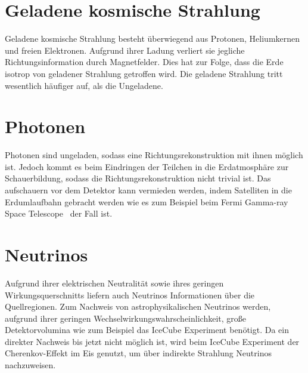 \section*{Geladene kosmische Strahlung}
Geladene kosmische Strahlung besteht überwiegend aus Protonen, Heliumkernen und freien Elektronen. 
Aufgrund ihrer Ladung verliert sie jegliche Richtungsinformation durch Magnetfelder. 
Dies hat zur Folge, dass die Erde isotrop von geladener Strahlung getroffen wird.
Die geladene Strahlung tritt wesentlich häufiger auf, als die Ungeladene. 

\section*{Photonen}
Photonen sind ungeladen, sodass eine Richtungsrekonstruktion mit ihnen möglich ist. 
Jedoch kommt es beim Eindringen der Teilchen in die Erdatmosphäre zur Schauerbildung, sodass die Richtungsrekonstruktion nicht trivial ist. 
Das aufschauern vor dem Detektor kann vermieden werden, indem Satelliten in die Erdumlaufbahn gebracht werden wie es zum Beispiel beim Fermi Gamma-ray Space Telescope~\cite{fermi} der Fall ist.

\section*{Neutrinos}
Aufgrund ihrer elektrischen Neutralität sowie ihres geringen Wirkungsquerschnitts liefern auch Neutrinos Informationen über die Quellregionen. 
Zum Nachweis von astrophysikalischen Neutrinos werden, aufgrund ihrer geringen Wechselwirkungswahrscheinlichkeit, große Detektorvolumina wie zum Beispiel das IceCube Experiment benötigt.
Da ein direkter Nachweis bis jetzt nicht möglich ist, wird beim IceCube Experiment \cite{icecube} der Cherenkov-Effekt im Eis genutzt, um über indirekte Strahlung Neutrinos nachzuweisen.

